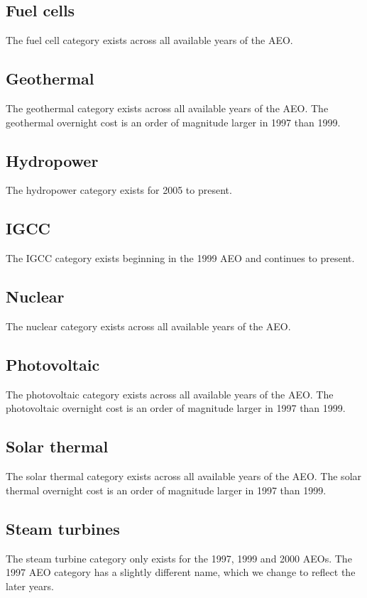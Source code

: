 \documentclass[10pt]{report}
\begin{document}
\subsection{Fuel cells}
The fuel cell category exists across all available years of the AEO.

\subsection{Geothermal}
The geothermal category exists across all available years of the AEO.
The geothermal overnight cost is an order of magnitude larger in 1997 than 1999.

\subsection{Hydropower}
The hydropower category exists for 2005 to present.

\subsection{IGCC}
The IGCC category exists beginning in the 1999 AEO and continues to present.  

\subsection{Nuclear}
The nuclear category exists across all available years of the AEO. 


\subsection{Photovoltaic} 
The photovoltaic category exists across all available years of the AEO. 
The photovoltaic overnight cost is an order of magnitude larger in 1997 than 1999.

\subsection{Solar thermal}
The solar thermal category exists across all available years of the AEO. 
The solar thermal overnight cost is an order of magnitude larger in 1997 than 1999.

\subsection{Steam turbines}
The steam turbine category only exists for the 1997, 1999 and 2000 AEOs.
The 1997 AEO category has a slightly different name, which we change to reflect the later years. 
\end{document}
